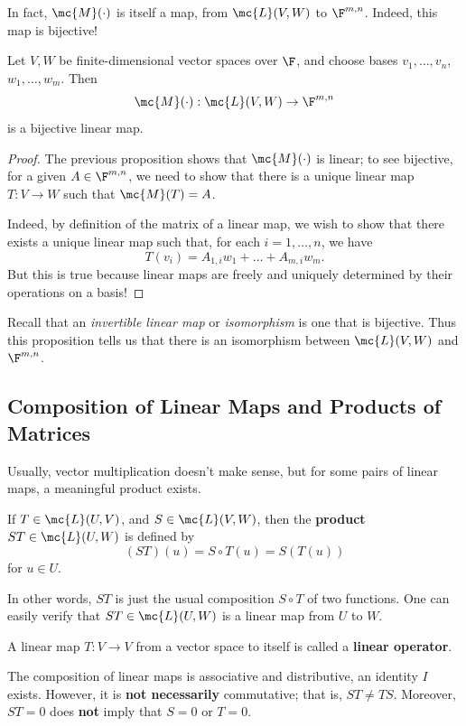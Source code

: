 \documentclass[math0540-lecture-notes.tex]{subfiles}
\begin{document}
In fact, $\mc{M}(\cdot )$ is itself a map, from $\mc{L}(V,W)$ to $\F^{m,n}$. Indeed, this map is
bijective!
\begin{proposition}[]{}
  Let $V,W$ be finite-dimensional vector spaces over $\F$, and choose bases $v_1,\ldots,v_n$, $
  w_1,\ldots,w_m$. Then \[
    \mc{M}(\cdot ): \mc{L}(V,W)\to \F^{m,n}
  \] is a bijective linear map.
\end{proposition}
\begin{proof}[Proof]
  The previous proposition shows that $\mc{M}(\cdot )$ is linear; to see bijective, for a given
  $A\in \F^{m,n}$, we need to show that there is a unique linear map $T:V\to W$ such that
  $\mc{M}(T)=A$.

  Indeed, by definition of the matrix of a linear map, we wish to show that there exists a unique
  linear map such that, for each $i=1,\ldots,n$, we have \[
    T(v_i)=A_{1,i}w_1+\ldots+A_{m,i}w_m
  .\] But this is true because linear maps are freely and uniquely determined by their operations on
  a basis!
\end{proof}

\begin{remark}
  Recall that an \textit{invertible linear map} or \textit{isomorphism} is one that is bijective.
  Thus this proposition tells us that there is an isomorphism between $\mc{L}(V,W)$ and $\F^{m,n}$.
\end{remark}

\subsection{Composition of Linear Maps and Products of Matrices}

Usually, vector multiplication doesn't make sense, but for some pairs of linear maps, a meaningful
product exists.
\begin{definition}{}
  If $T\in \mc{L}(U,V)$, and $S\in \mc{L}(V,W)$, then the \textbf{product} $ST\in \mc{L}(U,W)$ is
  defined by \[
    (ST)(u)=S\circ T(u)=S(T(u))
  \] for $u\in U.$
\end{definition}
In other words, $ST$ is just the usual composition $S\circ T$ of two functions. One can easily
verify that $ST\in \mc{L}(U,W)$ is a linear map from $U$ to $W$.

\begin{definition}{}
  A linear map $T:V\to V$ from a vector space to itself is called a \textbf{linear operator}.
\end{definition}
\begin{proposition}[]{}
  The composition of linear maps is associative and distributive, an identity $I$ exists. However,
  it is \textbf{not necessarily} commutative; that is, $ST\neq TS$. Moreover, $ST=0$ does
  \textbf{not} imply that $S=0$ or $T=0$.
\end{proposition}
\end{document}
